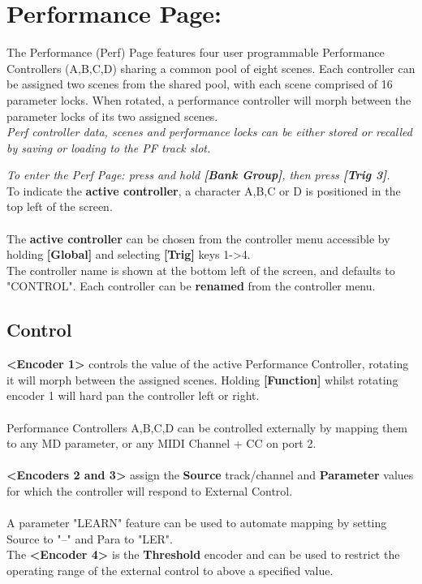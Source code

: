 \chapter{Performance Page:}
The Performance (Perf) Page features four user programmable Performance Controllers (A,B,C,D) sharing a common pool of eight scenes. Each controller can be assigned two scenes from the shared pool, with each scene comprised of 16 parameter locks.  When rotated, a performance controller will morph between the parameter locks of its two assigned scenes.\\

\textit{Perf controller data, scenes and performance locks can be either stored or recalled by saving or loading to the PF track slot.}

\textit{To enter the Perf Page: press and hold \textbf{[Bank Group]}, then press \textbf{[Trig 3]}.}
\\
To indicate the \textbf{active controller}, a character  A,B,C or D is positioned in the top left of the screen.\\\\
The \textbf{active controller} can be chosen from the controller menu accessible by holding \textbf{[Global]} and selecting \textbf{[Trig]} keys 1->4.\\
\newpage
The controller name is shown at the bottom left of the screen, and defaults to "CONTROL". Each controller can be \textbf{renamed} from the controller menu.
\section{Control}
\textbf{<Encoder 1>} controls the value of the active Performance Controller, rotating it will morph between the assigned scenes. Holding \textbf{[Function]} whilst rotating encoder 1 will hard pan the controller left or right.\\
\\
Performance Controllers A,B,C,D can be controlled externally by mapping them to any MD parameter, or any MIDI Channel + CC on port 2. \\\\
\textbf{<Encoders 2 and 3>} assign the \textbf{Source} track/channel and \textbf{Parameter} values for which the controller will respond to External Control.\\\\
A parameter "LEARN" feature can be used to automate mapping by setting Source to "--" and Para to "LER".
\\
The \textbf{<Encoder 4>} is the \textbf{Threshold} encoder and can be used to restrict the operating range of the external control to above a specified value.

